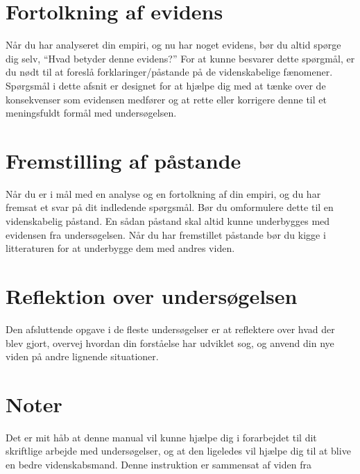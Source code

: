  \section{Fortolkning af evidens}
\label{sec:FaE}
Når du har analyseret din empiri, og nu har noget evidens, bør du altid spørge dig selv, ``Hvad betyder denne evidens?'' For at kunne besvarer dette spørgmål, er du nødt til at foreslå forklaringer/påstande på de videnskabelige fænomener. Spørgsmål i dette afsnit er designet for at hjælpe dig med at tænke over de konsekvenser som evidensen medfører og at rette eller korrigere denne til et meningsfuldt formål med undersøgelsen.

\section{Fremstilling af påstande}
\label{sec:FaP}
Når du er i mål med en analyse og en fortolkning af din empiri, og du har fremsat et svar på dit indledende spørgsmål. Bør du omformulere dette til en videnskabelig påstand. En sådan påstand skal altid kunne underbygges med evidensen fra undersøgelsen. Når du har fremstillet påstande bør du kigge i litteraturen for at underbygge dem med andres viden.

\section{Reflektion over undersøgelsen}
\label{sec:RoU}
Den afsluttende opgave i de fleste undersøgelser er at reflektere over hvad der blev gjort, overvej hvordan din forståelse har udviklet sog, og anvend din nye viden på andre lignende situationer.

\section{Noter}
Det er mit håb at denne manual vil kunne hjælpe dig i forarbejdet til dit skriftlige arbejde med undersøgelser, og at den ligeledes vil hjælpe dig til at blive en bedre videnskabsmand. Denne instruktion er sammensat af viden fra \citep{Greenbowe2005, Krogh2016}